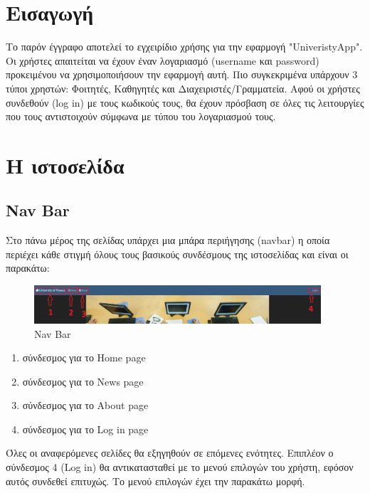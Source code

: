 \documentclass[12pt]{article}
\begin{document}
	\tableofcontents
	
	\newpage
	
	\section{Εισαγωγή}
	
	Το παρόν έγγραφο αποτελεί το εγχειρίδιο χρήσης για την εφαρμογή "UniveristyApp". Οι χρήστες απαιτείται να έχουν έναν λογαριασμό (username και password) προκειμένου να χρησιμοποιήσουν την εφαρμογή αυτή. Πιο συγκεκριμένα υπάρχουν 3 τύποι χρηστών: Φοιτητές, Καθηγητές και Διαχειριστές/Γραμματεία. Αφού οι χρήστες συνδεθούν (log in) με τους κωδικούς τους, θα έχουν πρόσβαση σε όλες τις λειτουργίες που τους αντιστοιχούν σύμφωνα με τύπου του λογαριασμού τους.
	
	\section{Η ιστοσελίδα}
	
	\subsection{Nav Bar}
	
	Στο πάνω μέρος της σελίδας υπάρχει μια μπάρα περιήγησης (navbar) η οποία περιέχει κάθε στιγμή όλους τους βασικούς συνδέσμους της ιστοσελίδας και είναι οι παρακάτω:
	
	\begin{figure}[H]
		\centering
		\includegraphics[width=0.95\textwidth]{homes2.png}
		\caption{Nav Bar}
		\label{fig:bar}
	\end{figure}
	
	\begin{enumerate}
		\item σύνδεσμος για το Home page 
		\item σύνδεσμος για το News page
		\item σύνδεσμος για το About page
		\item σύνδεσμος για το Log in page
	\end{enumerate}
	
	Όλες οι αναφερόμενες σελίδες θα εξηγηθούν σε επόμενες ενότητες. Επιπλέον ο σύνδεσμος 4 (Log in) θα αντικατασταθεί με το μενού επιλογών του χρήστη, εφόσον αυτός συνδεθεί επιτυχώς. Το μενού επιλογών έχει την παρακάτω μορφή.
	
\end{document}

